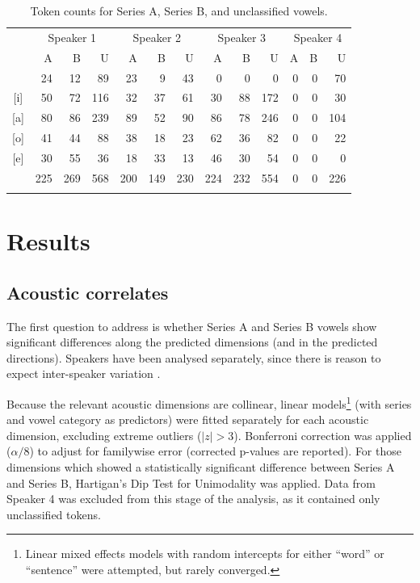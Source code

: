\documentclass[output=paper,newtxmath,modfonts,nonflat,hidelinks]{langsci/langscibook}
\begin{document}
\begin{table}
\begin{tabular}{c*{12}{r}}
\lsptoprule
   & \multicolumn{3}{c}{Speaker 1} & \multicolumn{3}{c}{Speaker 2} & \multicolumn{3}{c}{Speaker 3} & \multicolumn{3}{c}{Speaker 4} \\\cmidrule(lr){2-4}\cmidrule(lr){5-7}\cmidrule(lr){8-10}\cmidrule(lr){11-13}
   & {A}        & {B}       & {U}        & {A}        & {B}        & {U}       & {A}        & {B}       &{ U}        & {A}        & {B}	 & {U }        \\\midrule\relax
[u] & 24       & 12      & 89       & 23       & 9        & 43      & 0       & 0      & 0       &0&0& 70        \\
{[i]} & 50       & 72      & 116      & 32       & 37       & 61      & 30       & 88      & 172      &0&0& 30        \\
 {[a]} & 80       & 86      & 239      & 89       & 52       & 90      & 86       & 78      & 246      &0&0& 104       \\
 {[o]} & 41       & 44      & 88       & 38       & 18       & 23      & 62       & 36      & 82       &0&0& 22        \\
 {[e]} & 30       & 55      & 36       & 18       & 33       & 13      & 46       & 30      & 54       &0&0& 0       \\\midrule
 & 225	& 269		& 568		& 200		& 149		& 230	& 224		& 232		& 554		&0&0& 226\\
\lspbottomrule
\end{tabular}
\caption{Token counts for Series A, Series B, and unclassified vowels.}
\label{tab:kbgy:2}
\end{table}

\section{Results}
\label{results}

\subsection{Acoustic correlates}
\label{correlates}

The first question to address is whether Series A and Series B vowels show significant differences along the predicted dimensions (and in the predicted directions).  Speakers have been analysed separately, since there is reason to expect inter-speaker variation \citep{Andrzejewski1955}.

Because the relevant acoustic dimensions are collinear, linear models\footnote{Linear mixed effects models with random intercepts for either ``word'' or ``sentence'' were attempted, but rarely converged.} (with series and vowel category as predictors) were fitted separately for each acoustic dimension, excluding extreme outliers ($|z|>3$).  Bonferroni correction was applied ($\alpha/8$) to adjust for familywise error (corrected p-values are reported).  For those dimensions which showed a statistically significant difference between Series A and Series B, Hartigan's Dip Test for Unimodality was applied.  Data from Speaker 4 was excluded from this stage of the analysis, as it contained only unclassified tokens.
\end{document}
